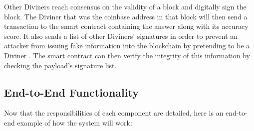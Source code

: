 \documentclass{article}
\begin{document}
Other Diviners reach consensus on the validity of a block and digitally sign the block. The Diviner that was the coinbase address in that block will then send a transaction to the smart contract containing the answer along with its accuracy score. It also sends a list of other Diviners' signatures in order to prevent an attacker from issuing fake information into the blockchain by pretending to be a Diviner . The smart contract can then verify the integrity of this information by checking the payload's signature list.


\subsection{End-to-End Functionality}

Now that the responsibilities of each component are detailed, here is an end-to-end example of how the system will work:
\end{document}
